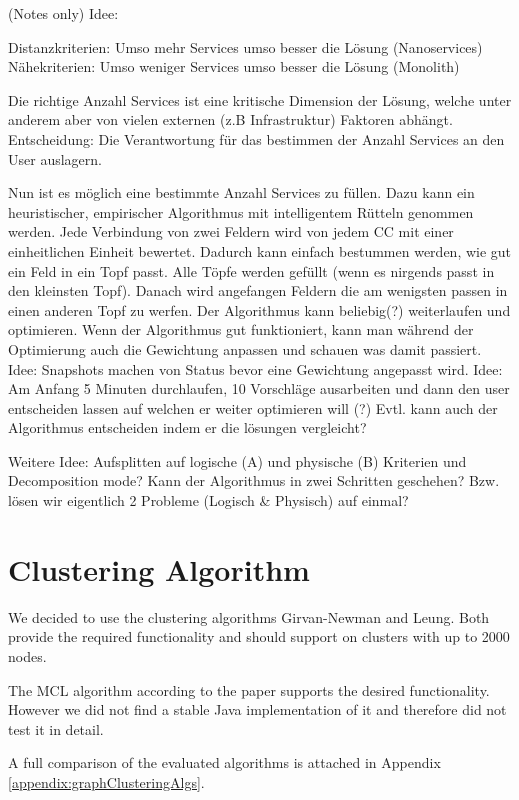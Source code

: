 (Notes only)
Idee:

Distanzkriterien: Umso mehr Services umso besser die Lösung (Nanoservices)
Nähekriterien: Umso weniger Services umso besser die Lösung (Monolith)

Die richtige Anzahl Services ist eine kritische Dimension der Lösung, welche unter anderem aber von vielen externen (z.B Infrastruktur) Faktoren abhängt. Entscheidung: Die Verantwortung für das bestimmen der Anzahl Services an den User auslagern.

Nun ist es möglich eine bestimmte Anzahl Services zu füllen. Dazu kann ein heuristischer, empirischer Algorithmus mit intelligentem Rütteln genommen werden. 
Jede Verbindung von zwei Feldern wird von jedem CC mit einer einheitlichen Einheit bewertet. Dadurch kann einfach bestummen werden, wie gut ein Feld in ein Topf passt. Alle Töpfe werden gefüllt (wenn es nirgends passt in den kleinsten Topf). Danach wird angefangen Feldern die am wenigsten passen in einen anderen Topf zu werfen.
Der Algorithmus kann beliebig(?) weiterlaufen und optimieren. Wenn der Algorithmus gut funktioniert, kann man während der Optimierung auch die Gewichtung anpassen und schauen was damit passiert.
Idee: Snapshots machen von Status bevor eine Gewichtung angepasst wird.
Idee: Am Anfang 5 Minuten durchlaufen, 10 Vorschläge ausarbeiten und dann den user entscheiden lassen auf welchen er weiter optimieren will (?) Evtl. kann auch der Algorithmus entscheiden indem er die lösungen vergleicht? 

Weitere Idee: Aufsplitten auf logische (A) und physische (B) Kriterien und Decomposition mode? Kann der Algorithmus in zwei Schritten geschehen? Bzw. lösen wir eigentlich 2 Probleme (Logisch \& Physisch) auf einmal?


\section{Clustering Algorithm}

We decided to use the clustering algorithms Girvan-Newman and Leung. Both provide the required functionality and should support on clusters with up to 2000 nodes. %

The \gls{MCL} algorithm according to the paper\cite{markovCluster} supports the desired functionality. However we did not find a stable Java implementation of it and therefore did not test it in detail.

A full comparison of the evaluated algorithms is attached in Appendix \ref{appendix:graphClusteringAlgs}.

